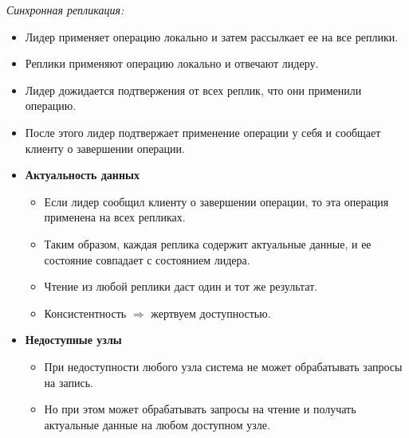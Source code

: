 \begin{definition}
    \textit{Синхронная репликация:}
    \begin{itemize}
        \item Лидер применяет операцию локально и затем рассылкает ее на все реплики.
        \item Реплики применяют операцию локально и отвечают лидеру.
        \item Лидер дожидается подтвержения от всех реплик, что они применили операцию.
        \item После этого лидер подтвержает применение операции у себя и сообщает клиенту о завершении операции.

        \item \textbf{Актуальность данных}
        \begin{itemize}
            \item Если лидер сообщил клиенту о завершении операции, то эта операция применена на всех репликах.
            \item Таким образом, каждая реплика содержит актуальные данные, и ее состояние совпадает с состоянием лидера.
            \item Чтение из любой реплики даст один и тот же результат.
            \item Консистентность $\Rightarrow$ жертвуем доступностью.
        \end{itemize}

        \item \textbf{Недоступные узлы}
        \begin{itemize}
            \item При недоступности любого узла система не может обрабатывать запросы на запись.
            \item Но при этом может обрабатывать запросы на чтение и получать актуальные данные на любом доступном узле.
        \end{itemize}

    \end{itemize}
\end{definition}

